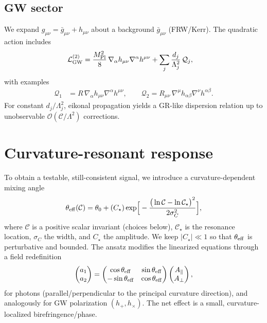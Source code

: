 \documentclass[%
 reprint,
 amsmath,amssymb,
 aps,
 pra,
 longbibliography,
 nofootinbib
]{revtex4-2}
\newcommand{\Lag}{\mathcal{L}}
\newcommand{\Ord}[1]{\mathcal{O}\!\left(#1\right)}
\begin{document}
\subsection{GW sector}
\label{sec:gw-sector}
We expand $g_{\mu\nu}=\bar g_{\mu\nu}+h_{\mu\nu}$ about a background $\bar g_{\mu\nu}$ (FRW/Kerr). The quadratic action includes
\begin{align}
\Lag_{\rm GW}^{(2)} &= \frac{M_{\rm Pl}^2}{8}\,\nabla_\alpha h_{\mu\nu}\nabla^\alpha h^{\mu\nu}
+\sum_j \frac{d_j}{\Lambda_j^2}\,\mathcal{Q}_j,
\end{align}
with examples
\begin{align}
\mathcal{Q}_1 &= R\,\nabla_\alpha h_{\mu\nu}\nabla^\alpha h^{\mu\nu},\qquad
\mathcal{Q}_2 = R_{\mu\nu}\,\nabla^\mu h_{\alpha\beta}\nabla^\nu h^{\alpha\beta}.
\end{align}
For constant $d_j/\Lambda_j^2$, eikonal propagation yields a GR-like dispersion relation up to unobservable $\Ord{\mathcal{C}/\Lambda^2}$ corrections.

\section{Curvature-resonant response}
\label{sec:resonant}
To obtain a testable, still-consistent signal, we introduce a curvature-dependent mixing angle
\begin{equation}
\theta_{\rm eff}(\mathcal{C})=\theta_0+\left(C_\star\right)
\exp\!\Big[-\frac{\big(\ln \mathcal{C}-\ln \mathcal{C}_\star\big)^2}{2\sigma_C^2}\Big],
\label{eq:thetaeff}
\end{equation}
where $\mathcal{C}$ is a positive scalar invariant (choices below), $\mathcal{C}_\star$ is the resonance location, $\sigma_C$ the width, and $C_\star$ the amplitude. We keep $|C_\star|\ll 1$ so that $\theta_{\rm eff}$ is perturbative and bounded. The ansatz modifies the linearized equations through a field redefinition
\begin{equation}
\begin{pmatrix} a_1 \\ a_2 \end{pmatrix}=
\begin{pmatrix}
\cos\theta_{\rm eff} & \sin\theta_{\rm eff} \\
-\sin\theta_{\rm eff} & \cos\theta_{\rm eff}
\end{pmatrix}
\begin{pmatrix} A_\parallel \\ A_\perp \end{pmatrix},
\end{equation}
for photons (parallel/perpendicular to the principal curvature direction), and analogously for GW polarization $(h_+,h_\times)$. The net effect is a small, curvature-localized birefringence/phase.
\end{document}
